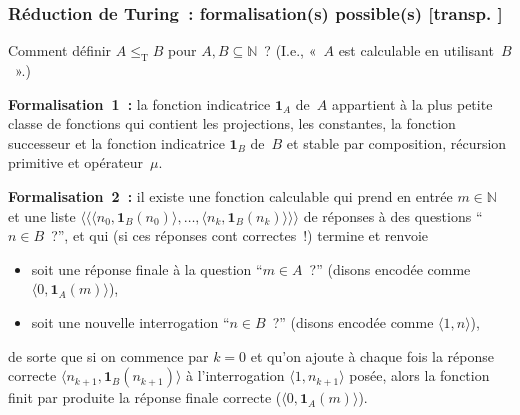 \documentclass[mathserif,a4paper,aspectratio=169]{beamer}
\newcommand{\dbllangle}{\mathopen{\langle\!\langle}}
\newcommand{\dblrangle}{\mathclose{\rangle\!\rangle}}
\renewcommand{\frametitle}[1]{\subsubsection*{#1 {\footnotesize[transp. \insertframenumber]}}}
\begin{document}
\begin{frame}
\frametitle{Réduction de Turing : formalisation(s) possible(s)}

Comment définir $A \mathrel{\leq_\mathrm{T}} B$ pour $A, B \subseteq
\mathbb{N}$ ?  {\footnotesize (I.e., « $A$ est calculable en
  utilisant $B$ ».)}

\bigskip

\textbf{Formalisation 1 :} la fonction indicatrice $\mathbf{1}_A$
de $A$ appartient à la plus petite classe de fonctions qui contient
les projections, les constantes, la fonction successeur \alert{et la
  fonction indicatrice $\mathbf{1}_B$ de $B$} et stable par
composition, récursion primitive et opérateur $\mu$.

\bigskip

\textbf{Formalisation 2 :} il existe une fonction calculable qui prend
en entrée $m \in \mathbb{N}$ et une liste $\dbllangle \langle n_0,
\mathbf{1}_B(n_0)\rangle, \ldots, \langle n_k,
\mathbf{1}_B(n_k)\rangle \dblrangle$ de réponses à des questions “$n
\in B$ ?”, et qui (si ces réponses cont correctes !) termine et renvoie
\begin{itemize}
\item soit une réponse finale à la question “$m \in A$ ?” (disons
  encodée comme $\langle 0, \mathbf{1}_A(m)\rangle$),
\item soit une nouvelle interrogation “$n \in B$ ?” (disons encodée
  comme $\langle 1, n\rangle$),
\end{itemize}
de sorte que si on commence par $k=0$ et qu'on ajoute à chaque fois la
réponse correcte $\langle n_{k+1}, \mathbf{1}_B(n_{k+1})\rangle$ à
l'interrogation $\langle 1, n_{k+1}\rangle$ posée, alors la fonction
finit par produite la réponse finale correcte ($\langle 0,
\mathbf{1}_A(m)\rangle$).

\end{frame}
%
\end{document}
